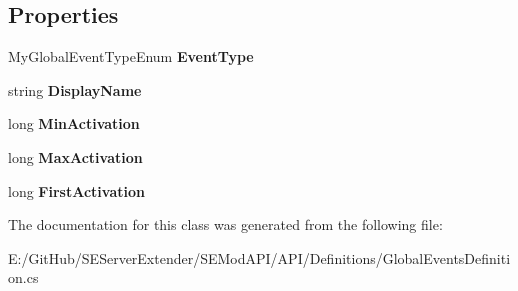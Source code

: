 \subsection*{Properties}
\begin{DoxyCompactItemize}
\item 
\hypertarget{class_s_e_mod_a_p_i_1_1_a_p_i_1_1_definitions_1_1_global_events_definition_a4535a315c997a7d455abcc44985937bb}{}My\+Global\+Event\+Type\+Enum {\bfseries Event\+Type}\label{class_s_e_mod_a_p_i_1_1_a_p_i_1_1_definitions_1_1_global_events_definition_a4535a315c997a7d455abcc44985937bb}

\item 
\hypertarget{class_s_e_mod_a_p_i_1_1_a_p_i_1_1_definitions_1_1_global_events_definition_a4f746995321e40c6397040ca99cb40d5}{}string {\bfseries Display\+Name}\label{class_s_e_mod_a_p_i_1_1_a_p_i_1_1_definitions_1_1_global_events_definition_a4f746995321e40c6397040ca99cb40d5}

\item 
\hypertarget{class_s_e_mod_a_p_i_1_1_a_p_i_1_1_definitions_1_1_global_events_definition_a36da757509cea22fd2921054d0aad2a3}{}long {\bfseries Min\+Activation}\label{class_s_e_mod_a_p_i_1_1_a_p_i_1_1_definitions_1_1_global_events_definition_a36da757509cea22fd2921054d0aad2a3}

\item 
\hypertarget{class_s_e_mod_a_p_i_1_1_a_p_i_1_1_definitions_1_1_global_events_definition_a3ec4c82064578614bf0aabccaa0a3e1c}{}long {\bfseries Max\+Activation}\label{class_s_e_mod_a_p_i_1_1_a_p_i_1_1_definitions_1_1_global_events_definition_a3ec4c82064578614bf0aabccaa0a3e1c}

\item 
\hypertarget{class_s_e_mod_a_p_i_1_1_a_p_i_1_1_definitions_1_1_global_events_definition_a24cb9529968563c222b0f52eef07a3fa}{}long {\bfseries First\+Activation}\label{class_s_e_mod_a_p_i_1_1_a_p_i_1_1_definitions_1_1_global_events_definition_a24cb9529968563c222b0f52eef07a3fa}

\end{DoxyCompactItemize}


The documentation for this class was generated from the following file\+:\begin{DoxyCompactItemize}
\item 
E\+:/\+Git\+Hub/\+S\+E\+Server\+Extender/\+S\+E\+Mod\+A\+P\+I/\+A\+P\+I/\+Definitions/Global\+Events\+Definition.\+cs\end{DoxyCompactItemize}
